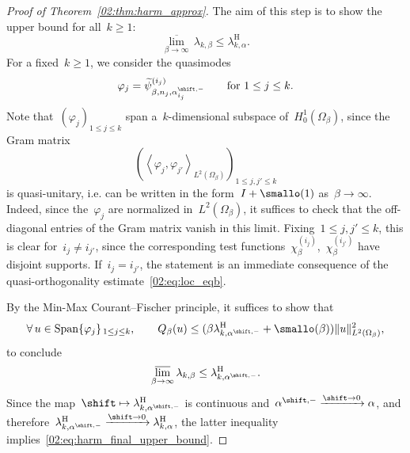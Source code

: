 \begin{proof}[Proof of Theorem~\ref{02:thm:harm_approx}]
        The aim of this step is to show the upper bound for all~$k\geq 1$:
        \begin{equation}
            \label{02:eq:harm_final_upper_bound}
            \underset{\beta\to\infty}{\overline\lim}\,\lambda_{k,\beta} \leq \lambda_{k,\alpha}^{\mathrm{H}}.
        \end{equation}
        For a fixed~$k\geq 1$, we consider the quasimodes
        \[\varphi_j = \widetilde\psi_{\beta,n_j,\alpha^{\shift,-}_{i_j}}^{(i_j)}\qquad \text{for }1\leq j\leq k.\]
        Note that~$(\varphi_j)_{1\leq j \leq k}$ span a~$k$-dimensional subspace of~$H_0^1(\Omega_\beta)$, since the Gram matrix~$$\left(\left\langle \varphi_j,\varphi_{j'}\right\rangle_{L^2(\Omega_\beta)}\right)_{1\leq j,j'\leq k}$$ is quasi-unitary, i.e. can be written in the form~$I + \smallo(1)$ as~$\beta\to\infty$. Indeed, since the~$\varphi_j$ are normalized in~$L^2(\Omega_\beta)$, it suffices to check that the off-diagonal entries of the Gram matrix vanish in this limit.
        Fixing~$1\leq j,j'\leq k$, this is clear for~$i_j \neq i_{j'}$, since the corresponding test functions~$\chi_\beta^{(i_j)}$,~$\chi_\beta^{(i_{j'})}$ have disjoint supports. If~$i_j = i_{j'}$, the statement is an immediate consequence of the quasi-orthogonality estimate~\eqref{02:eq:loc_eqb}.%
        
        By the Min-Max Courant--Fischer principle, it suffices to show that
        \begin{equation}
            \label{02:eq:thm1_ub}
            \forall\,u\in \mathrm{Span}\{\varphi_j\}_{\,1\leq j \leq k},\qquad Q_\beta(u) \leq (\beta\lambda_{k,\alpha^{\shift,-}}^{\mathrm{H}}+\smallo(\beta))\|u\|_{L^2(\Omega_\beta)}^2,
        \end{equation}
        to conclude
        \[\underset{\beta\to\infty}{\overline\lim}\,\lambda_{k,\beta} \leq \lambda_{k,\alpha^{\shift,-}}^{\mathrm{H}}.\]
        Since the map~$\shift\mapsto\lambda_{k,\alpha^{\shift,-}}^{\mathrm{H}}$ is continuous and~${\alpha^{\shift,-} \xrightarrow{\shift\to 0} \alpha}$, 
        and therefore~$\lambda_{k,\alpha^{\shift,-}}^{\mathrm{H}}\xrightarrow{\shift\to 0} \lambda_{k,\alpha}^{\mathrm H}$, the latter inequality implies~\eqref{02:eq:harm_final_upper_bound}.


\end{proof}
